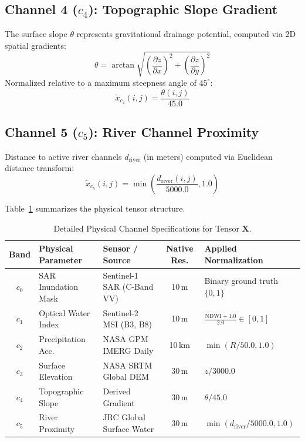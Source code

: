 \documentclass[12pt,a4paper,oneside]{report}
\begin{document}
\subsection{Channel 4 ($c_4$): Topographic Slope Gradient}
The surface slope $\theta$ represents gravitational drainage potential, computed via 2D spatial gradients:
\begin{equation}
\theta = \arctan \sqrt{\left(\frac{\partial z}{\partial x}\right)^2 + \left(\frac{\partial z}{\partial y}\right)^2}
\end{equation}
Normalized relative to a maximum steepness angle of $45^\circ$:
\begin{equation}
\tilde{x}_{c_4}(i, j) = \frac{\theta(i, j)}{45.0}
\end{equation}

\subsection{Channel 5 ($c_5$): River Channel Proximity}
Distance to active river channels $d_{\text{river}}$ (in meters) computed via Euclidean distance transform:
\begin{equation}
\tilde{x}_{c_5}(i, j) = \min\left( \frac{d_{\text{river}}(i, j)}{5000.0}, 1.0 \right)
\end{equation}

Table~\ref{tab:channel_spec} summarizes the physical tensor structure.

\begin{table}[H]
\centering
\caption{Detailed Physical Channel Specifications for Tensor $\mathbf{X}$.}
\label{tab:channel_spec}
\begin{tabularx}{\textwidth}{cllcX}
\toprule
\textbf{Band} & \textbf{Physical Parameter} & \textbf{Sensor / Source} & \textbf{Native Res.} & \textbf{Applied Normalization} \\
\midrule
$c_0$ & SAR Inundation Mask & Sentinel-1 SAR (C-Band VV) & 10\,m & Binary ground truth $\{0, 1\}$ \\
$c_1$ & Optical Water Index & Sentinel-2 MSI (B3, B8) & 10\,m & $\frac{\text{NDWI} + 1.0}{2.0} \in [0, 1]$ \\
$c_2$ & Precipitation Acc. & NASA GPM IMERG Daily & 10\,km & $\min(R / 50.0, 1.0)$ \\
$c_3$ & Surface Elevation & NASA SRTM Global DEM & 30\,m & $z / 3000.0$ \\
$c_4$ & Topographic Slope & Derived Gradient & 30\,m & $\theta / 45.0$ \\
$c_5$ & River Proximity & JRC Global Surface Water & 30\,m & $\min(d_{\text{river}} / 5000.0, 1.0)$ \\
\bottomrule
\end{tabularx}
\end{table}
\end{document}
